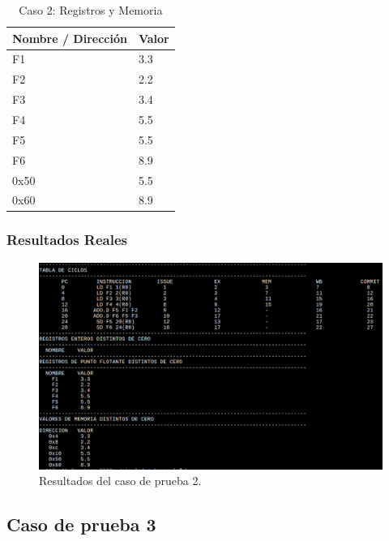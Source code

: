 \documentclass[a4paper]{article}
\begin{document}
	\begin{table}[H]
		\centering
		\caption*{Caso 2: Registros y Memoria}
		\begin{tabular}{|l|l|}
			\hline
			\textbf{Nombre / Dirección} & \textbf{Valor} \\ \hline
			F1                          & 3.3            \\ \hline
			F2                          & 2.2            \\ \hline
			F3                          & 3.4            \\ \hline
			F4                          & 5.5            \\ \hline
			F5                          & 5.5            \\ \hline
			F6                          & 8.9            \\ \hline
			0x50                        & 5.5            \\ \hline
			0x60                        & 8.9            \\ \hline
		\end{tabular}
	\end{table}

	\subsubsection*{Resultados Reales}

	\begin{figure}[H]
	\centering
	\includegraphics[width=1\textwidth]{figures/test2.png}
	\caption{\label{fig:bloques}Resultados del caso de prueba 2.}
	\end{figure}


	\subsection*{Caso de prueba 3}
\end{document}

